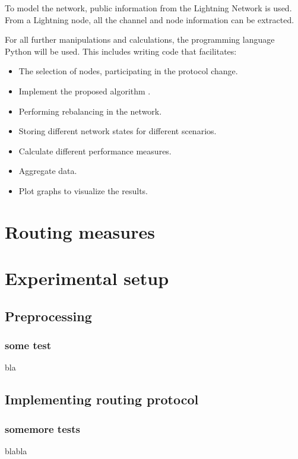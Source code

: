 \documentclass[draft]{fhnwreport}       %
\begin{document}
To model the network, public information from the Lightning Network is used. From a Lightning node, all the channel and node information can be extracted.

For all further manipulations and calculations, the programming language Python will be used. This includes writing code that facilitates: 
\begin{itemize}
  \item The selection of nodes, participating in the protocol change.
  \item Implement the proposed algorithm \cite[p.~3]{pickhardt_imbalance_2019}.
  \item Performing rebalancing in the network.
  \item Storing different network states for different scenarios.
  \item Calculate different performance measures.
  \item Aggregate data.
  \item Plot graphs to visualize the results.
\end{itemize}

\section{Routing measures}
\section{Experimental setup}

\subsection{Preprocessing}
\subsubsection{some test}
bla
\subsection{Implementing routing protocol}
\subsubsection{somemore tests}
blabla
\end{document}
